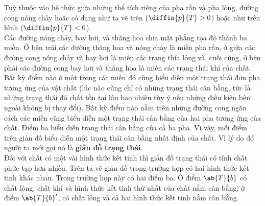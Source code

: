 Tuỳ thuộc vào hệ thức giữa những thể tích riêng của pha rắn và pha lỏng, đường cong nóng chảy hoặc có dạng như ta vẽ trên  ($\diffin{p}{T}>0$) hoặc như trên hình  ($\diffin{p}{T}<0$).\\

Các đường nóng chảy, bay hơi, và thăng hoa chia mặt phẳng tọa độ thành ba miền. Ở bên trái các đường thăng hoa và nóng chảy là miền pha rắn, ở giữa các đường cong nóng chảy và bay hơi là miền các trạng thía lỏng và, cuối cùng, ở bên phải các đường cong bay hơi và thăng hoa là miền các trạng thái khí của chất. Bất kỳ điểm nào ở một trong các miền đó cũng biểu diễn một trạng thái đơn pha tương ứng của vật chất (lúc nào cũng chỉ có những trạng thái cân bằng, tức là những trạng thái đó chất tồn tại lâu bao nhiêu tùy ý nếu những điều kiện bên ngoài không bị thay đổi). Bất kỳ điểm nào nằm trên những đường cong ngăn cách các miền cũng biểu diễn một trạng thái cân bằng của hai pha tương ứng của chất. Điểm ba biểu diễn trạng thái cân bằng của cả ba pha. Vì vậy, mỗi điểm trên giản đồ biểu diễn một trạng thái cân bằng nhất định của chất. Vì lý do đó người ta mới gọi nó là \textbf{giản đồ trạng thái}.\\

Đối với chất có một vài hình thức kết tinh thì giản đồ trạng thái có tính chất phức tạp hơn nhiều. Trên  ta vẽ giản đồ trong trường hợp có hai hình thức kết tinh khác nhau. Trong trường hợp này có hai điểm ba. Ở điểm $\ab{T}{b}$ có chất lỏng, chất khí và hình thức kết tinh thứ nhất của chất nằm cân bằng; ở điểm $\ab{T}{b}'$, có chất lỏng và cả hai hình thức kết tinh nằm cân bằng.\\


